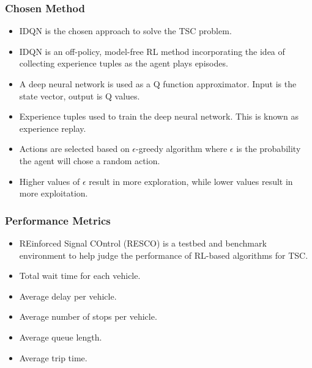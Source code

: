 \documentclass[compress,12pt]{beamer}
\begin{document}
\begin{frame}[bg=arguelles.png]
      \frametitle{Chosen Method}
      \begin{itemize}
      \item IDQN is the chosen approach to solve the TSC problem.
      \item IDQN is an off-policy, model-free RL method incorporating the idea of collecting experience tuples as the agent plays episodes.
      \item A deep neural network is used as a Q function approximator. Input is the state vector, output is Q values.
      \item Experience tuples used to train the deep neural network. This is known as experience replay.
      \item Actions are selected based on \(\epsilon\)-greedy algorithm where \(\epsilon\) is the probability the agent will chose a random action.
      \item Higher values of \(\epsilon\) result in more exploration, while lower values result in more exploitation.
      \end{itemize}
\end{frame}

\begin{frame}[bg=arguelles.png]
      \frametitle{Performance Metrics}
      \begin{itemize}
      \item REinforced Signal COntrol (RESCO) is a testbed and benchmark environment to help judge the performance of RL-based algorithms for TSC.
      \item Total wait time for each vehicle.
      \item Average delay per vehicle.
      \item Average number of stops per vehicle.
      \item Average queue length.
      \item Average trip time.
      \end{itemize}
\end{frame}

\end{document}
